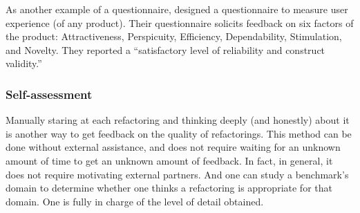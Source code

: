 As another example of a questionnaire, 
designed a questionnaire to measure user experience (of any product).
Their questionnaire solicits feedback on
six factors of the product: Attractiveness, Perspicuity, Efficiency, Dependability,
Stimulation, and Novelty. They reported a ``satisfactory level
of reliability and construct validity.''





\subsubsection{Self-assessment}
Manually staring at each refactoring and thinking deeply (and honestly) about it is another way to get feedback on the quality of refactorings. This method can be done without external assistance, and does not require waiting for an unknown amount of time to get an unknown amount of feedback. In fact, in general, it does not require motivating external partners. And one can study a benchmark's domain to determine whether one thinks a refactoring is appropriate for that domain. One is fully in charge of the level of detail obtained.

